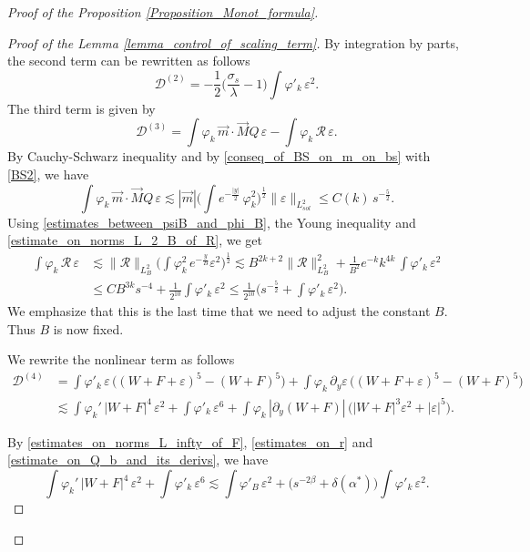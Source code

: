 \documentclass[16pt,english, oneside,reqno]{smfart}
\newcommand{\vare}{{\varepsilon}}
\newcommand{\vphi}{{\varphi}}
\begin{document}
\begin{proof}[Proof of the Proposition \ref{Proposition_Monot_formula}]
\begin{proof}[Proof of the Lemma \ref{lemma_control_of_scaling_term}]
By integration by parts, the second term can be rewritten as follows
\begin{equation}
    \mathcal{D}^{(2)} = -\frac{1}{2}\Big( \frac{\sigma_s}{\lambda}-1 \Big)\int \vphi'_k \,\vare^2.
\end{equation}
The third term is given by
\begin{equation}
    \mathcal{D}^{(3)} = \int \vphi_k\, \vec{m} \cdot \vec{M}Q\,\vare - \int \vphi_k \,\mathcal{R}\, \vare.
\end{equation}
By Cauchy-Schwarz inequality and by \eqref{conseq_of_BS_on_m_on_bs} with \eqref{BS2}, we have
\begin{equation}
    \int \vphi_k\, \vec{m} \cdot \vec{M}Q\,\vare \lesssim |\vec{m}| \Big( \int e^{-\frac{|y|}{2}}\, \vphi^2_k \Big)^{\frac{1}{2}} \|\vare\|_{L^2_{sol}} \leq C(k)\,s^{-\frac{5}{2}}.
\end{equation}
Using \eqref{estimates_between_psiB_and_phi_B}, the Young inequality and \eqref{estimate_on_norms_L_2_B_of_R}, we get
\begin{equation}
    \begin{split}
        \int \vphi_k\,\mathcal{R}\,\vare &\lesssim \|\mathcal{R}\|_{L^2_B} \Big( \int \vphi^2_k \, e^{-\frac{y}{B}} \vare^2\Big)^{\frac{1}{2}}\lesssim B^{2k+2}\|\mathcal{R}\|^2_{L^2_B} + \frac{1}{B^2}e^{-k}k^{4k}\,\int \vphi'_k\,\vare^2\\ 
        & \leq CB^{3k}s^{-4} + \frac{1}{2^{10}}\int \vphi'_k\, \vare^2
        \leq \frac{1}{2^{10}} \Big(s^{-\frac{5}{2}} + \int \vphi'_k\, \vare^2 \Big).
    \end{split}
\end{equation}
We emphasize that this is the last time that we need to adjust the constant $B$.
Thus $B$ is now fixed.

We rewrite the nonlinear term as follows
\begin{equation}
\begin{split}
    \mathcal{D}^{(4)}  & = \int \vphi'_k\, \vare\, \big( (W+F+\vare)^5 - (W+F)^5 \big) + \int \vphi_k \,\partial_y \vare\, \big( (W+F+\vare)^5 - (W+F)^5 \big)\\
    & \lesssim \int \vphi_k'\, |W+F|^4 \, \vare^2 + \int \vphi'_k \,\vare^6 + \int \vphi_k\,|\partial_y(W+F)|\,\big( |W+F|^3\vare^2 + |\vare|^5 \big).
\end{split}
\end{equation}

By \eqref{estimates_on_norms_L_infty_of_F}, \eqref{estimates_on_r} and \eqref{estimate_on_Q_b_and_its_derivs}, we have
\begin{equation}
    \int \vphi_k'\, |W+F|^4 \, \vare^2 + \int \vphi'_k \,\vare^6 \lesssim \int \vphi'_B \, \vare^2 + \big( s^{-2\beta} + \delta(\alpha^*) \big)\int \vphi'_k \,\vare^2.
\end{equation}


\end{proof}
\end{proof}
\end{document}

